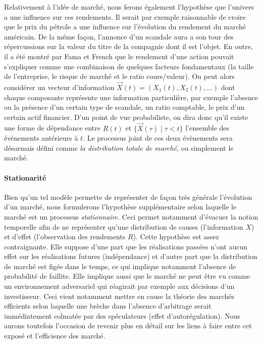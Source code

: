 Relativement à l'idée de marché, nous ferons également l'hypothèse que l'univers a une
influence sur ces rendements. Il serait par exemple raisonnable de croire que le prix du
pétrole a une influence sur l'évolution du rendement du marché américain. De la même
façon, l'annonce d'un scandale aura a son tour des répercussions sur la valeur du titre de
la compagnie dont il est l'objet. En outre, il a été montré par Fama et French que le
rendement d'une action pouvait s'expliquer comme une combinaison de quelques facteurs
fondamentaux (la taille de l'entreprise, le risque de marché et le ratio cours/valeur). On
peut alors considérer un vecteur d'information $\vec X(t) = (X_1(t), X_2(t), \dots)$ dont
chaque composante représente une information particulière, par exemple l'absence ou la
présence d'un certain type de scandale, un ratio comptable, le prix d'un certain actif
financier\reph. D'un point de vue probabiliste, on dira donc qu'il existe une forme de
dépendance entre $R(t)$ et $\{\vec X(\tau) \mid \tau < t\}$ l'ensemble des évènements antérieurs à
$t$. Le processus joint de ces deux évènements sera désormais défini comme \textit{la
  distribution totale de marché}, ou simplement le marché.


\paragraph{Stationarité}

Bien qu'un tel modèle permette de représenter de façon très générale l'évolution d'un
marché, nous formulerons l'hypothèse supplémentaire selon laquelle le marché est un
processus \textit{stationnaire}. Ceci permet notamment d'évacuer la notion temporelle afin
de ne représenter qu'une distribution de causes (l'information $X$) et d'effet
(l'observation des rendements $R$). Cette hypothèse est assez contraignante. Elle suppose
d'une part que les réalisations passées n'ont aucun effet sur les réalisations futures
(indépendance) et d'autre part que la distribution de marché est figée dans le temps, ce
qui implique notamment l'absence de probabilité de faillite. Elle implique aussi que le
marché ne peut être vu comme un environnement adversariel qui réagirait par exemple aux
décisions d'un investisseur. Ceci vient notamment mettre en cause la théorie des marchés
efficients selon laquelle une brèche dans l'absence d'arbitrage serait immédiatement
colmatée par des spéculateurs (effet d'autorégulation). Nous aurons toutefois l'occasion
de revenir plus en détail sur les liens à faire entre cet exposé et l'efficience des
marché.

